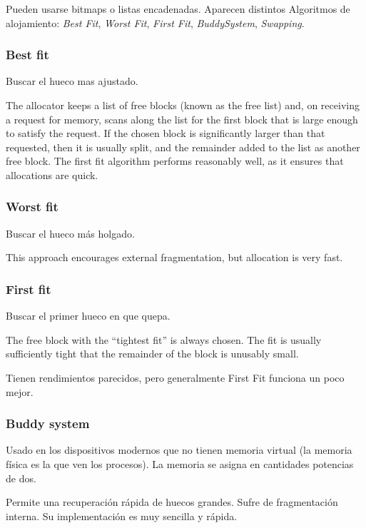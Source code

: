 \documentclass[a4paper, twoside]{article}
\begin{document}
Pueden usarse bitmaps o listas encadenadas.
Aparecen distintos Algoritmos de alojamiento: \emph{Best Fit}, \emph{Worst
Fit}, \emph{First Fit}, \emph{BuddySystem}, \emph{Swapping}.

\subsubsection{Best fit}

Buscar el hueco mas ajustado.

The allocator keeps a list of free blocks (known as the free list) and,
on receiving a request for memory, scans along the list for the first block
that is large enough to satisfy the request.
If the chosen block is significantly larger than that requested, then it is
usually split, and the remainder added to the list as another free block.
The first fit algorithm performs reasonably well, as it ensures that
allocations are quick.

\subsubsection{Worst fit}

Buscar el hueco más holgado.

This approach encourages external fragmentation, but allocation is very fast.

\subsubsection{First fit}

Buscar el primer hueco en que quepa.

The free block with the ``tightest fit'' is always chosen.
The fit is usually sufficiently tight that the remainder of the block is
unusably small.

Tienen rendimientos parecidos, pero generalmente First Fit funciona un poco
mejor.

\subsubsection{Buddy system} 

Usado en los dispositivos modernos que no tienen memoria virtual (la memoria
física es la que ven los procesos).
La memoria se asigna en cantidades potencias de dos.

Permite una recuperación rápida de huecos grandes.
Sufre de fragmentación interna. Su implementación es muy sencilla y rápida.
\end{document}
